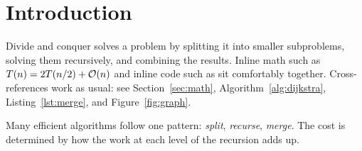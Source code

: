 \section{Introduction}
Divide and conquer solves a problem by splitting it into smaller subproblems,
solving them recursively, and combining the results. Inline math such as
$T(n) = 2T(n/2) + \O(n)$ and inline code such as 
sit comfortably together. Cross-references work as usual: see
Section~\ref{sec:math}, Algorithm~\ref{alg:dijkstra}, Listing~\ref{lst:merge},
and Figure~\ref{fig:graph}.

\begin{keyidea}
Many efficient algorithms follow one pattern: \emph{split}, \emph{recurse}, \emph{merge}.
The cost is determined by how the work at each level of the recursion adds up.
\end{keyidea}


